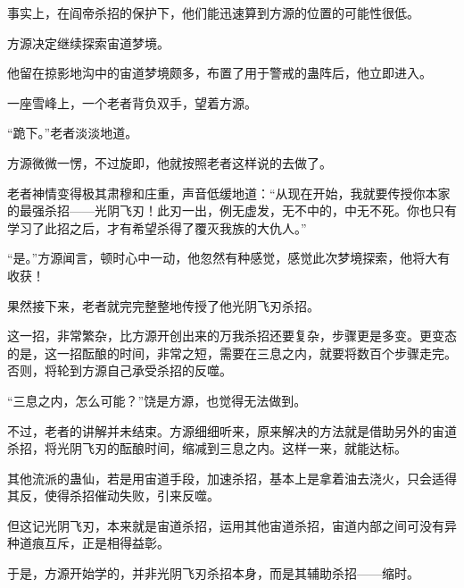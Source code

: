 \begin{this_body}
事实上，在阎帝杀招的保护下，他们能迅速算到方源的位置的可能性很低。

方源决定继续探索宙道梦境。

他留在掠影地沟中的宙道梦境颇多，布置了用于警戒的蛊阵后，他立即进入。

一座雪峰上，一个老者背负双手，望着方源。

“跪下。”老者淡淡地道。

方源微微一愣，不过旋即，他就按照老者这样说的去做了。

老者神情变得极其肃穆和庄重，声音低缓地道：“从现在开始，我就要传授你本家的最强杀招——光阴飞刃！此刃一出，例无虚发，无不中的，中无不死。你也只有学习了此招之后，才有希望杀得了覆灭我族的大仇人。”

“是。”方源闻言，顿时心中一动，他忽然有种感觉，感觉此次梦境探索，他将大有收获！

果然接下来，老者就完完整整地传授了他光阴飞刃杀招。

这一招，非常繁杂，比方源开创出来的万我杀招还要复杂，步骤更是多变。更变态的是，这一招酝酿的时间，非常之短，需要在三息之内，就要将数百个步骤走完。否则，将轮到方源自己承受杀招的反噬。

“三息之内，怎么可能？”饶是方源，也觉得无法做到。

不过，老者的讲解并未结束。方源细细听来，原来解决的方法就是借助另外的宙道杀招，将光阴飞刃的酝酿时间，缩减到三息之内。这样一来，就能达标。

其他流派的蛊仙，若是用宙道手段，加速杀招，基本上是拿着油去浇火，只会适得其反，使得杀招催动失败，引来反噬。

但这记光阴飞刃，本来就是宙道杀招，运用其他宙道杀招，宙道内部之间可没有异种道痕互斥，正是相得益彰。

于是，方源开始学的，并非光阴飞刃杀招本身，而是其辅助杀招——缩时。

\end{this_body}


